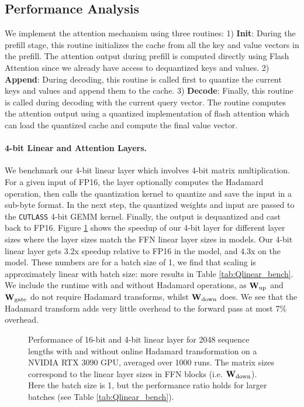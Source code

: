 \subsection{Performance Analysis}\label{sec:appx_performance_analysis}

 We implement the attention mechanism using three routines: 1) \textbf{Init}: During the prefill stage, this routine initializes the cache from all the key and value vectors in the prefill. The attention output during prefill is computed directly using Flash Attention \citep{flash-attention} since we already have access to dequantized keys and values. 2) \textbf{Append}: During decoding, this routine is called first to quantize the current keys and values and append them to the cache. 3) \textbf{Decode}: Finally, this routine is called during decoding with the current query vector. The routine computes the attention output using a quantized implementation of flash attention which can load the quantized cache and compute the final value vector. 

\paragraph{4-bit Linear and Attention Layers.} We benchmark our 4-bit linear layer which involves 4-bit matrix multiplication. For a given input of FP16, the layer optionally computes the Hadamard operation, then calls the quantization kernel to quantize and save the input in a sub-byte format. In the next step, the quantized weights and input are passed to the \texttt{CUTLASS} 4-bit GEMM kernel. Finally, the output is dequantized and cast back to FP16. Figure \ref{fig:linear_timing} shows the speedup of our 4-bit layer for different layer sizes where the layer sizes match the FFN linear layer sizes in \llama models. Our 4-bit linear layer gets 3.2x speedup relative to FP16 in the \llamaSmall model, and 4.3x on the \llamaBig model. These numbers are for a batch size of 1, we find that scaling is approximately linear with batch size: more results in Table \ref{tab:Qlinear_bench}. We include the runtime with and without Hadamard operations, as ${\mathbf{W}}_\textrm{up}$ and ${\mathbf{W}}_\textrm{gate}$ do not require Hadamard transforms, whilst ${\mathbf{W}}_\textrm{down}$ does. We see that the Hadamard transform adds very little overhead to the forward pass at most 7\% overhead.

\begin{figure}
    \centering
    \caption{\label{fig:linear_timing} Performance of 16-bit and 4-bit linear layer for 2048 sequence lengths with and without online Hadamard transformation on a NVIDIA RTX 3090 GPU, averaged over 1000 runs. The matrix sizes correspond to the linear layer sizes in \llama FFN blocks (i.e. ${\mathbf{W}}_\textrm{down}$). Here the batch size is 1, but the performance ratio holds for larger batches (see Table \ref{tab:Qlinear_bench}).}
\end{figure}



